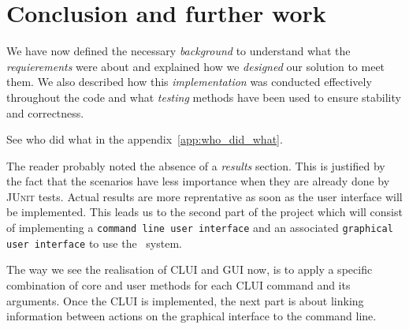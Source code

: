 \section{Conclusion and further work} %
\label{sec:conclusion}
We have now defined the necessary \emph{background} to understand
what the \emph{requierements} were about and explained how we \emph{designed} 
our solution to meet them. We also described how this 
\emph{implementation} was conducted effectively throughout the code
and what \emph{testing} methods have been used to ensure stability
and correctness.

See who did what in the appendix~\ref{app:who_did_what}.


The reader probably noted the absence of a \emph{results} section.
This is justified by the fact that the scenarios have less importance
when they are already done by \textsc{JUnit} tests. Actual results are more
reprentative as soon as the
user interface will be implemented.
This leads us to the second part of the project which will
consist of implementing a \texttt{command line user interface} and 
an associated \texttt{graphical user interface} to use the \MyFoodora~system.

The way we see the realisation of CLUI and GUI now, is to apply a specific combination of core and user methods for each CLUI command and its arguments.
Once the CLUI is implemented, the next part is about linking
information between actions on the graphical interface to the command line.



